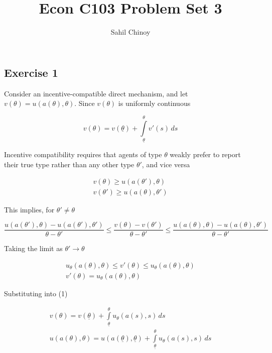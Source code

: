 \documentclass{article}
\title{Econ C103 Problem Set 3}
\author{Sahil Chinoy}
\begin{document}
\maketitle{}

\subsection*{Exercise 1}

Consider an incentive-compatible direct mechanism, and let $v(\theta) = u(a(\theta), \theta)$. Since $v(\theta)$ is uniformly continuous

\begin{equation}
v(\theta) = v(\underline{\theta}) + \int \limits_{\underline{\theta}} ^\theta v'(s) \, ds
\end{equation}

Incentive compatibility requires that agents of type $\theta$ weakly prefer to report their true type rather than any other type $\theta'$, and vice versa

\begin{gather*}
v(\theta) \geq u(a(\theta'), \theta) \\
v(\theta') \geq u(a(\theta), \theta') 
\end{gather*}

This implies, for $\theta' \neq \theta$

\begin{equation*}
\frac{u(a(\theta'), \theta) - u(a(\theta'), \theta')}{\theta - \theta'} \leq \frac{v(\theta) - v(\theta')}{\theta - \theta'} \leq \frac{u(a(\theta), \theta) - u(a(\theta), \theta')}{\theta - \theta'}
\end{equation*}

Taking the limit as $\theta' \to \theta$

\begin{gather*}
u_\theta(a(\theta),\theta) \leq v'(\theta) \leq u_\theta(a(\theta),\theta) \\
v'(\theta) = u_\theta(a(\theta),\theta)
\end{gather*}

Substituting into (1)

\begin{gather}
v(\theta) = v(\underline{\theta}) + \int \limits_{\underline{\theta}} ^\theta u_\theta(a(s),s) \, ds \nonumber \\
u(a(\theta), \theta) = u(a(\underline{\theta}), \underline{\theta}) + \int \limits_{\underline{\theta}} ^\theta u_\theta(a(s),s) \, ds
\end{gather}
\end{document}
